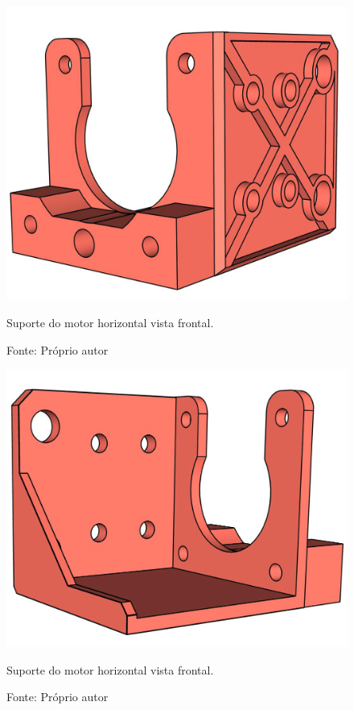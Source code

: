 \begin{figure}[H]
\centering
\includegraphics[scale = 0.4]{figuras/ressuportemotorhorizontalf}
\caption{Suporte do motor horizontal vista frontal.}
\caption*{Fonte: Próprio autor}
\label{fig:ressuportemotorhorizontalf}
\end{figure}

\begin{figure}[H]
\centering
\includegraphics[scale = 0.4]{figuras/ressuportemotorhorizontalfv}
\caption{Suporte do motor horizontal vista frontal.}
\caption*{Fonte: Próprio autor}
\label{fig:ressuportemotorhorizontalfv}
\end{figure}
        

